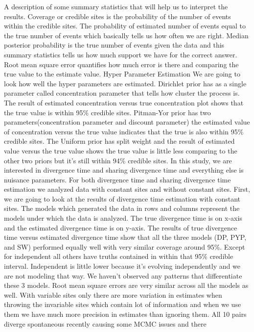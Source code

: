 \documentclass[letterpaper,12pt]{article}
\begin{document}
A description of some summary statistics that will help us to interpret the results. Coverage or credible sites is the probability
of the number of events within the credible sites. The probability of estimated number 
of events equal to the true number of events which basically tells us how often we 
are right. Median posterior probability is the true number of events given the data 
and this summary statistics tells us how much support we have for the correct answer.
Root mean square error quantifies how much error is there and comparing the true 
value to the estimate value. 
Hyper Parameter Estimation 
We are going to look how well the hyper parameters are estimated. Dirichlet
prior has as a single parameter called concentration parameter that tells how cluster 
the process is. The result of estimated concentration versus true concentration plot
shows that the true value is within 95\% credible sites. Pitman-Yor prior has two 
parameters(concentration parameter and discount parameter) the estimated value of 
concentration versus the true value indicates that the true is also within 95\%
credible sites. The Uniform prior has split weight and the result of estimated value 
versus the true value shows the true value is little less comparing to the other two 
priors but it's still within 94\% credible sites.
In this study, we are interested in divergence time and sharing divergence time and 
everything else is nuisance parameters. For both divergence time and sharing divergence time 
estimation we analyzed data with constant sites and without constant sites. First, we are going 
to look at the results of divergence time estimation with constant sites. The models which generated 
the data in rows and columns represent the models under which the data is analyzed. The true divergence 
time is on x-axis and the estimated divergence time is on y-axis. The results of true divergence 
time versus estimated divergence time show that all the three models (DP, PYP, and SW) performed
equally well with very similar coverage around 95\%. Except for independent all others have truths 
contained in within that 95\% credible interval. Independent is little lower because it's evolving 
independently and we are not modeling that way. We haven't observed any patterns that differentiate
these 3 models. Root mean square errors are very similar across all the models as well. 
With variable sites only there are more variation in estimates when throwing the invariable 
sites which contain lot of information and when we use them we have much more precision in estimates
than ignoring them. All 10 pairs diverge spontaneous recently causing some MCMC issues and there 
\end{document}
